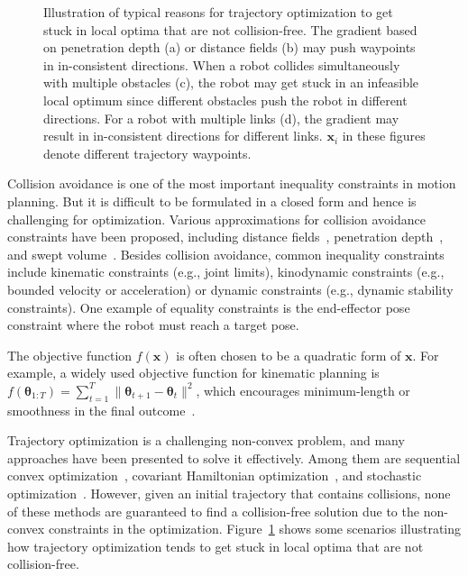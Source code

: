 \documentclass[letterpaper, 10 pt, conference]{ieeeconf}  %
\newcommand{\x}{\mbox{$\mathbf x$}}
\newcommand{\btheta}{\mbox{$\bm \theta$}}
\begin{document}
\begin{figure}[!h]
\caption{Illustration of typical reasons for trajectory optimization to get stuck in local optima that are not collision-free. The gradient based on penetration depth (a) or distance fields (b) may push waypoints in in-consistent directions. When a robot collides simultaneously with multiple obstacles (c), the robot may get stuck in an infeasible local optimum since different obstacles push the robot in different directions. For a robot with multiple links (d), the gradient may result in in-consistent directions for different links. $\mathbf x_i$ in these figures denote different trajectory waypoints.}
\label{fig:badgradient}
\end{figure}


Collision avoidance is one of the most important inequality constraints in motion planning. But it is difficult to be formulated in a closed form and hence is challenging for optimization. Various approximations for collision avoidance constraints have been proposed, including distance fields~\cite{Khatib:1985:ROA, Ratliff:2009:CGO}, penetration depth~\cite{Cameron:1997:CMP}, and swept volume~\cite{Schulman:2013:FLO}. Besides collision avoidance, common inequality constraints include kinematic constraints (e.g., joint limits), kinodynamic constraints (e.g., bounded velocity or acceleration) or dynamic constraints (e.g., dynamic stability constraints). One example of equality constraints is the end-effector pose constraint where the robot must reach a target pose.

The objective function $f(\x)$ is often chosen to be a quadratic form of $\x$. For example, a widely used objective function for kinematic planning is $f(\btheta_{1:T}) = \sum_{t=1}^T \|\btheta_{t+1} - \btheta_{t}\|^2$, which encourages minimum-length or smoothness in the final outcome~\cite{Schulman:2013:FLO,Ratliff:2009:CGO}.


Trajectory optimization is a challenging non-convex problem, and many approaches have been presented to solve it effectively. Among them are sequential convex optimization~\cite{Schulman:2013:FLO}, covariant Hamiltonian optimization~\cite{Ratliff:2009:CGO}, and stochastic optimization~\cite{Kalakrishnan:2011:STOMP}. However, given an initial trajectory that contains collisions, none of these methods are guaranteed to find a collision-free solution due to the non-convex constraints in the optimization. Figure~\ref{fig:badgradient} shows some scenarios illustrating how trajectory optimization tends to get stuck in local optima that are not collision-free. 
\end{document}
